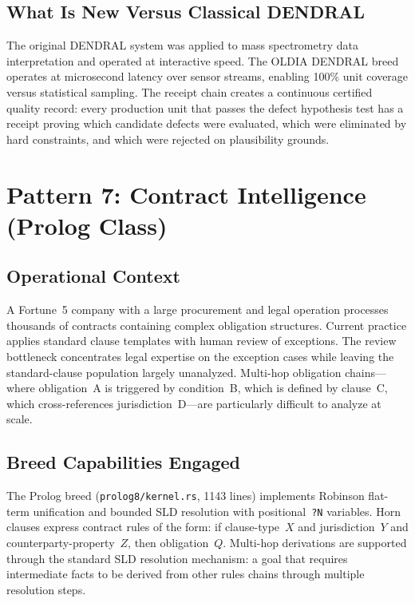 \subsection*{What Is New Versus Classical DENDRAL}

The original DENDRAL system was applied to mass spectrometry data interpretation
and operated at interactive speed. The OLDIA DENDRAL breed operates at microsecond
latency over sensor streams, enabling 100\% unit coverage versus statistical sampling.
The receipt chain creates a continuous certified quality record: every production
unit that passes the defect hypothesis test has a receipt proving which candidate
defects were evaluated, which were eliminated by hard constraints, and which were
rejected on plausibility grounds.

\section{Pattern 7: Contract Intelligence (Prolog Class)}
\label{sec:prolog-deployment}

\subsection*{Operational Context}

A Fortune~5 company with a large procurement and legal operation processes thousands
of contracts containing complex obligation structures. Current practice applies
standard clause templates with human review of exceptions. The review bottleneck
concentrates legal expertise on the exception cases while leaving the standard-clause
population largely unanalyzed. Multi-hop obligation chains---where obligation~A
is triggered by condition~B, which is defined by clause~C, which cross-references
jurisdiction~D---are particularly difficult to analyze at scale.

\subsection*{Breed Capabilities Engaged}

The Prolog breed (\texttt{prolog8/kernel.rs}, 1143 lines) implements Robinson
flat-term unification and bounded SLD resolution with positional~\texttt{?N}
variables. Horn clauses express contract rules of the form: if clause-type~$X$
and jurisdiction~$Y$ and counterparty-property~$Z$, then obligation~$Q$. Multi-hop
derivations are supported through the standard SLD resolution mechanism: a goal
that requires intermediate facts to be derived from other rules chains through
multiple resolution steps.

